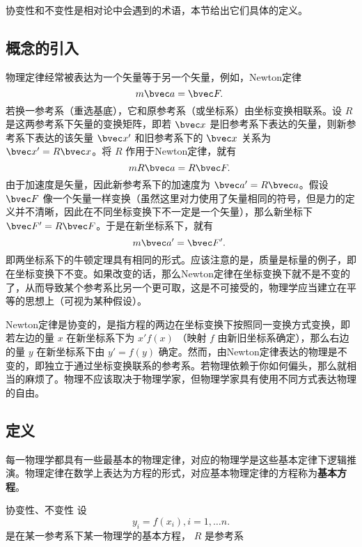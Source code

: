 
协变性和不变性是相对论中会遇到的术语，本节给出它们具体的定义。
\subsection{概念的引入}
物理定律经常被表达为一个矢量等于另一个矢量，例如，Newton定律 
\begin{equation}
m\bvec a=\bvec F.~
\end{equation}
若换一参考系（重选基底），它和原参考系（或坐标系）由坐标变换相联系。设 $R$ 是这两参考系下矢量的变换矩阵，即若 $\bvec x$ 是旧参考系下表达的矢量，则新参考系下表达的该矢量 $\bvec x'$ 和旧参考系下的 $\bvec x$ 关系为 $\bvec x'=R\bvec x$。将 $R$ 作用于Newton定律，就有
\begin{equation}
mR\bvec a=R\bvec F.~
\end{equation}
由于加速度是矢量，因此新参考系下的加速度为 $\bvec a'=R\bvec a$。假设 $\bvec F$ 像一个矢量一样变换（虽然这里对力使用了矢量相同的符号，但是力的定义并不清晰，因此在不同坐标变换下不一定是一个矢量），那么新坐标下 $\bvec F'=R\bvec F$。于是在新坐标系下，就有
\begin{equation}
m\bvec a'=\bvec F'.~
\end{equation}
即两坐标系下的牛顿定理具有相同的形式。应该注意的是，质量是标量的例子，即在坐标变换下不变。如果改变的话，那么Newton定律在坐标变换下就不是不变的了，从而导致某个参考系比另一个更可取，这是不可接受的，物理学应当建立在平等的思想上（可视为某种假设）。

Newton定律是协变的，是指方程的两边在坐标变换下按照同一变换方式变换，即若左边的量 $x$ 在新坐标系下为 $x'f(x)$ （映射 $f$ 由新旧坐标系确定），那么右边的量 $y$ 在新坐标系下由 $y'=f(y)$ 确定。然而，由Newton定律表达的物理是不变的，即独立于通过坐标变换联系的参考系。若物理依赖于你如何偏头，那么就相当的麻烦了。物理不应该取决于物理学家，但物理学家具有使用不同方式表达物理的自由。

\subsection{定义}
每一物理学都具有一些最基本的物理定律，对应的物理学是这些基本定律下逻辑推演。物理定律在数学上表达为方程的形式，对应基本物理定律的方程称为\textbf{基本方程}。
\begin{definition}{协变性、不变性}
设
\begin{equation}
y_i= f(x_i),i=1,\ldots n.
\end{equation}
是在某一参考系下某一物理学的基本方程， $R$ 是参考系

\end{definition}















